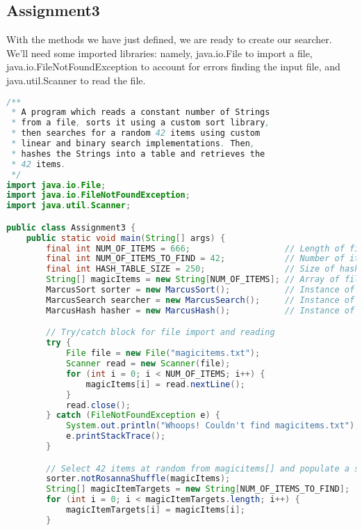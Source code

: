 \documentclass[letterpaper, 10pt]{article}
\begin{document}
\vspace{3.0em}

\subsection{Assignment3}

\hspace{1.0em}With the methods we have just defined, we are ready to create our searcher. We'll need some imported libraries: namely, java.io.File to import a file, java.io.FileNotFoundException to account for errors finding the input file, and java.util.Scanner to read the file.

\vspace{5.0em}

\begin{lstlisting}[language=Java]
/**
 * A program which reads a constant number of Strings
 * from a file, sorts it using a custom sort library,
 * then searches for a random 42 items using custom
 * linear and binary search implementations. Then,
 * hashes the Strings into a table and retrieves the
 * 42 items.
 */
import java.io.File;
import java.io.FileNotFoundException;
import java.util.Scanner;

public class Assignment3 {
    public static void main(String[] args) {
        final int NUM_OF_ITEMS = 666;                   // Length of file as constant
        final int NUM_OF_ITEMS_TO_FIND = 42;            // Number of items to find
        final int HASH_TABLE_SIZE = 250;                // Size of hash table
        String[] magicItems = new String[NUM_OF_ITEMS]; // Array of file strings
        MarcusSort sorter = new MarcusSort();           // Instance of MarcusSort
        MarcusSearch searcher = new MarcusSearch();     // Instance of MarcusSearch
        MarcusHash hasher = new MarcusHash();           // Instance of MarcusHash

        // Try/catch block for file import and reading
        try {
            File file = new File("magicitems.txt");
            Scanner read = new Scanner(file);
            for (int i = 0; i < NUM_OF_ITEMS; i++) {
                magicItems[i] = read.nextLine();
            }
            read.close();
        } catch (FileNotFoundException e) {
            System.out.println("Whoops! Couldn't find magicitems.txt");
            e.printStackTrace();
        }

        // Select 42 items at random from magicitems[] and populate a subarray
        sorter.notRosannaShuffle(magicItems);
        String[] magicItemTargets = new String[NUM_OF_ITEMS_TO_FIND];
        for (int i = 0; i < magicItemTargets.length; i++) {
            magicItemTargets[i] = magicItems[i];
        }


\end{lstlisting}
\end{document}
